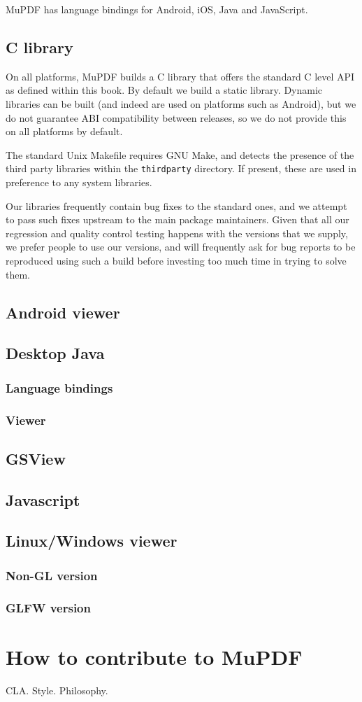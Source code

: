 \documentclass[oneside]{book}
\begin{document}
MuPDF has language bindings for Android, iOS, Java and JavaScript.

\section{C library}

On all platforms, MuPDF builds a C library that offers the standard C level API as defined within this book. By default we build a static library. Dynamic libraries can be built (and indeed are used on platforms such as Android), but we do not guarantee ABI compatibility between releases, so we do not provide this on all platforms by default.

The standard Unix Makefile requires GNU Make, and detects the presence of the third party libraries within the \texttt{thirdparty} directory. If present, these are used in preference to any system libraries.

Our libraries frequently contain bug fixes to the standard ones, and we attempt to pass such fixes upstream to the main package maintainers. Given that all our regression and quality control testing happens with the versions that we supply, we prefer people to use our versions, and will frequently ask for bug reports to be reproduced using such a build before investing too much time in trying to solve them.

\section{Android viewer}
\section{Desktop Java}
\subsection{Language bindings}
\subsection{Viewer}
\section{GSView}
\section{Javascript}
\section{Linux/Windows viewer}
\subsection{Non-GL version}
\subsection{GLFW version}




\appendix

\chapter{How to contribute to MuPDF}

CLA. Style. Philosophy.

\backmatter
\printindex
\end{document}
